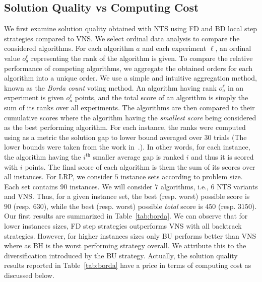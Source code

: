 \documentclass{acm_proc_article-sp}
\begin{document}
\subsection{Solution Quality vs Computing Cost}
We first examine solution quality obtained with NTS using FD and BD local step strategies compared to VNS. We select ordinal data analysis to compare the considered algorithms. For each algorithm $a$ and each experiment $\ell$, an ordinal value $o_a^{\ell}$ representing the rank of the algorithm is given. To compare the relative performance of competing algorithms, we aggregate the obtained orders for each algorithm into a unique order. We use a simple and intuitive aggregation method, known as the \emph{Borda count} voting method. An algorithm having rank $o_a^{\ell}$ in an experiment is given $o_a^{\ell}$ points, and the total score of an algorithm is simply the sum of its ranks over all experiments. The algorithms are then compared to their cumulative scores where the algorithm having the \emph{smallest score} being considered as the best performing algorithm. For each instance, the ranks were computed using as a metric the solution gap to lower bound averaged over $30$ trials (The lower bounds were taken from the work in~\cite{ulrp}.). In other words, for each instance, the algorithm having the $i^{\textrm{th}}$ smaller average gap is ranked $i$ and thus it is scored with $i$ points. The final score of each algorithm is them the sum of its scores over all instances. For LRP, we consider $5$ instance sets according to problem size. Each set contains $90$ instances. We will consider $7$ algorithms, i.e., $6$ NTS variants and VNS. Thus, for a given instance set, the best (resp. worst) possible score is $90$ (resp. $630$), while the best (resp. worst) possible \emph{total} score is $450$ (resp. $3150$). Our first results are summarized in Table~\ref{tab:borda}. We can observe that for lower instances sizes, FD step strategies outperforms VNS with all backtrack strategies. However, for higher instances sizes only BU performs better than VNS where as BH is the worst performing strategy overall. We attribute this to the diversification introduced by the BU strategy. Actually, the solution quality results reported in Table~\ref{tab:borda} have a price in terms of computing cost as discussed below.
\end{document}
